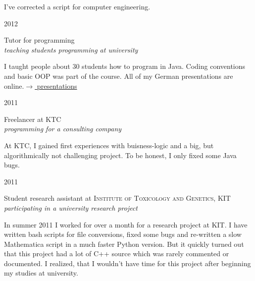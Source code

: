 \documentclass[a4paper,10pt]{article} %
\begin{document}
{\begin{minipage}[t]{0.5\textwidth}
\normalsize{I've corrected a script for computer engineering.}\\


{\raggedleft\textsc{2012}\par}

{\raggedright\large Tutor for programming\\
\textit{teaching students programming at university}\\[5pt]}

\normalsize{I taught people about 30 students how to program in Java.
Coding conventions and basic OOP was part of the course. All of my German presentations are online.}\hfill \href{http://martin-thoma.com/programmieren-tutorium/#Folien}{$\rightarrow$ presentations}\\


{\raggedleft\textsc{2011}\par}

{\raggedright\large Freelancer at KTC\\
\textit{programming for a consulting company}\\[5pt]}

\normalsize{At KTC, I gained first experiences with buisness-logic
and a big, but algorithmically not challenging project. To be honest,
I only fixed some Java bugs.}\\


{\raggedleft\textsc{2011}\par}

{\raggedright\large Student research assistant at \textsc{ Institute of Toxicology and Genetics}, KIT\\
\textit{participating in a university research project}\\[5pt]}

\normalsize{In summer 2011 I worked for over a month for a 
research project at KIT. I have written bash scripts for file
conversions, fixed some bugs and re-written a slow Mathematica script
in a much faster Python version. But it quickly turned out that
this project had a lot of C++ source which was rarely commented or
documented. I realized, that I wouldn't have time for this project
after beginning my studies at university.}\\


\end{minipage}}
\end{document}
